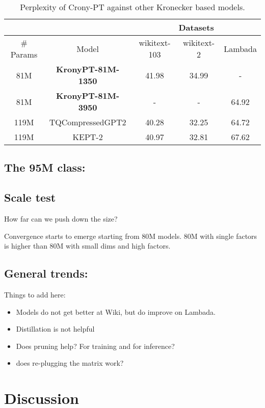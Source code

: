 \documentclass{article}
\begin{document}
{\begin{table}[h]
\centering
\begin{tabular}{|c|c|c|c|c|}
\hline
 & & \multicolumn{3}{c|}{Datasets} \\ \hline
\# Params &  Model            & wikitext-103 & wikitext-2 & Lambada \\ \hline
81M       & \textbf{KronyPT-81M-1350}  & 41.98        & 34.99      & -          \\ \hline
81M       & \textbf{KronyPT-81M-3950}  & -            & -          & 64.92      \\ \hline
119M       & TQCompressedGPT2  & 40.28        & 32.25      & 64.72      \\ \hline
119M       & KEPT-2   & 40.97        & 32.81      & 67.62      \\ \hline
\end{tabular}
\caption{Perplexity of Crony-PT against other Kronecker based models.}
\end{table}

\subsection{The 95M class:}%
\label{sub:The 95M class:}

\subsection{Scale test}%
\label{sub:Scale test}
How far can we push down the size? 

Convergence starts to emerge starting from 80M models.   80M with single factors is higher than 80M with small dims and high factors.

\subsection{General trends:}%

Things to add here:

\begin{itemize}
	\item Models do not get better at Wiki, but do improve on Lambada.
	\item Distillation is not helpful 
	\item Does pruning help? For training and for inference?
	\item does re-plugging the matrix work? 
\end{itemize}

\section{Discussion}%
\label{sec:Discussion}

}
\end{document}
